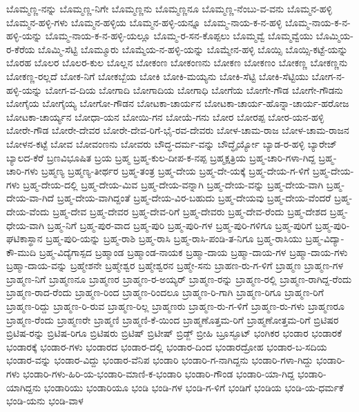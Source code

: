 ಬೊಮ್ಮಣ್ಣ-ನನ್ನು
ಬೊಮ್ಮಣ್ಣ-ನಿಗೇ
ಬೊಮ್ಮಣ್ಣನು
ಬೊಮ್ಮಣ್ಣನೂ
ಬೊಮ್ಮಣ್ಣ-ನೆಂಬು-ವ-ವನು
ಬೊಮ್ಮನ-ಹಳ್ಳಿ
ಬೊಮ್ಮನ-ಹಳ್ಳಿ-ಗಳು
ಬೊಮ್ಮನ-ಹಳ್ಳಿಯ
ಬೊಮ್ಮನ-ಹಳ್ಳಿ-ಯನ್ನೂ
ಬೊಮ್ಮ-ನಾಯ-ಕ-ನ-ಹಳ್ಳಿ
ಬೊಮ್ಮ-ನಾಯ-ಕ-ನ-ಹಳ್ಳಿ-ಯನ್ನು
ಬೊಮ್ಮ-ನಾಯ-ಕ-ನ-ಹಳ್ಳಿ-ಯಲ್ಲೂ
ಬೊಮ್ಮ-ರ-ಸನ-ಕೊಪ್ಪಲು
ಬೊಮ್ಮವ್ವೆ
ಬೊಮ್ಮವ್ವೆಯು
ಬೊಮ್ಮಿಯ-ರ-ಕೆರೆಯ
ಬೊಮ್ಮಿ-ಸೆಟ್ಟಿ
ಬೊಮ್ಮೂರು
ಬೊಮ್ಮೆಯ-ನ-ಹಳ್ಳಿ-ಯನ್ನು
ಬೊಮ್ಮೇನ-ಹಳ್ಳಿ
ಬೊಯ್ಸಿ
ಬೊಯ್ಸಿ-ಕಟ್ಟೆ-ಯನ್ನು
ಬೊರಹ
ಬೊಲರ
ಬೊಲರ-ಕುಲ
ಬೊಲ್ಲನ
ಬೋಕಂಣ
ಬೋಕಂಣನು
ಬೋಕಣ
ಬೋಕಣಂ
ಬೋಕಣ್ಣ
ಬೋಕಣ್ಣನು
ಬೋಕಣ್ಣ-ರಲ್ಲದೆ
ಬೋಕ-ನಿಗೆ
ಬೋಕಬ್ಬೆಯ
ಬೋಕಿ
ಬೋಕಿ-ಮಯ್ಯನು
ಬೋಕಿ-ಸೆಟ್ಟಿ
ಬೋಕಿ-ಸೆಟ್ಟಿಯು
ಬೋಗ-ನ-ಹಳ್ಳಿ-ಯನ್ನು
ಬೋಗ-ವ-ದಿಯ
ಬೋಗಾದಿ
ಬೋಗಾದಿಯ
ಬೋಗಾಧಿ
ಬೋಗೆಯ
ಬೋಗೇ-ಗೌಡ
ಬೋಗೇ-ಗೌಡನು
ಬೋಗೈಯ
ಬೋಗೈಯ್ಯ
ಬೋಗೋ-ಗೌಡನ
ಬೋಟಕಾ-ಚಾರ್ಯನ
ಬೋಟಕಾ-ಚಾರ್ಯ-ಹೊನ್ನಾ-ಚಾರ್ಯ-ಹರೋಜ
ಬೋಟಕಾ-ಚಾರ್ಯ್ಯನ
ಬೋಧಾ-ಯನ
ಬೋಯಿ-ಗನ
ಬೋಯೆ-ಗನು
ಬೋರ
ಬೋರಪ್ಪ
ಬೋರ-ಯನ-ಹಳ್ಳಿ
ಬೋರೇ-ಗೌಡ
ಬೋರೇ-ದೇವರ
ಬೋರೇ-ದೇವ-ರಿಗೆ-ಭೈ-ರವ-ದೇವರು
ಬೋಳ-ಚಾಮ-ರಾಜ
ಬೋಳ-ಚಾಮ-ರಾಜನ
ಬೋಳನ-ಕಟ್ಟೆ
ಬೋವ
ಬೋವಂಣನು
ಬೋವರು
ಬೌದ್ಧ-ದರ್ಮ-ವನ್ನು
ಬೌದ್ಧೈರ್ಯ್ಯೋ
ಬ್ಯಾಡ-ರ-ಹಳ್ಳಿ
ಬ್ಯಾರೇಜ್
ಬ್ಯಾಲದ-ಕೆರೆ
ಬ್ರಣವಿಭೂಷಿತ
ಬ್ರಯ
ಬ್ರಹ್ಮ
ಬ್ರಹ್ಮ-ಕುಲ-ದೀಪ-ಕ-ನಪ್ಪ
ಬ್ರಹ್ಮಕ್ಷತ್ರಿಯ
ಬ್ರಹ್ಮ-ಚಾರಿ-ಗಳಾ-ಗಿದ್ದ
ಬ್ರಹ್ಮ-ಚಾರಿ-ಗಳು
ಬ್ರಹ್ಮಣ್ಯ
ಬ್ರಹ್ಮಣ್ಯ-ತೀರ್ಥರ
ಬ್ರಹ್ಮ-ತಂತ್ರ
ಬ್ರಹ್ಮ-ದೇಯ
ಬ್ರಹ್ಮ-ದೇ-ಯಕ್ಕೆ
ಬ್ರಹ್ಮ-ದೇಯ-ಗ-ಳಿಗೆ
ಬ್ರಹ್ಮ-ದೇಯ-ಗಳು
ಬ್ರಹ್ಮ-ದೇಯ-ದಲ್ಲಿ
ಬ್ರಹ್ಮ-ದೇಯ-ಮಿವ
ಬ್ರಹ್ಮ-ದೇಯ-ವನ್ನಾಗಿ
ಬ್ರಹ್ಮ-ದೇಯ-ವನ್ನು
ಬ್ರಹ್ಮ-ದೇಯ-ವಾಗಿ
ಬ್ರಹ್ಮ-ದೇಯ-ವಾ-ಗಿದೆ
ಬ್ರಹ್ಮ-ದೇಯ-ವಾಗಿದ್ದಂತೆ
ಬ್ರಹ್ಮ-ದೇಯ-ವಿರ-ಬಹುದು
ಬ್ರಹ್ಮ-ದೇಯವು
ಬ್ರಹ್ಮ-ದೇಯ-ವೆಂದರೆ
ಬ್ರಹ್ಮ-ದೇಯ-ವೆಂದು
ಬ್ರಹ್ಮ-ದೇವ
ಬ್ರಹ್ಮ-ದೇವರ
ಬ್ರಹ್ಮ-ದೇವ-ರಿಗೆ
ಬ್ರಹ್ಮ-ದೇವರು
ಬ್ರಹ್ಮ-ದೇವ-ರೆಂದು
ಬ್ರಹ್ಮ-ದೇಶದ
ಬ್ರಹ್ಮ-ಧೇಯ-ವಾಗಿ
ಬ್ರಹ್ಮ-ನಿಗೆ
ಬ್ರಹ್ಮ-ಪುರ-ವಾದ
ಬ್ರಹ್ಮ-ಪುರಿ
ಬ್ರಹ್ಮ-ಪುರಿ-ಗಳ
ಬ್ರಹ್ಮ-ಪುರಿ-ಗಳಿಗೂ
ಬ್ರಹ್ಮ-ಪುರಿಗೆ
ಬ್ರಹ್ಮ-ಪುರಿ-ಘಟಿಕಾಸ್ಥಾನ
ಬ್ರಹ್ಮ-ಪುರಿ-ಯನ್ನು
ಬ್ರಹ್ಮ-ರಾಶಿ
ಬ್ರಹ್ಮ-ರಾಸಿ
ಬ್ರಹ್ಮ-ರಾಸಿ-ಪಂಡಿ-ತ-ನಿಗೂ
ಬ್ರಹ್ಮ-ರಾಸಿಯು
ಬ್ರಹ್ಮ-ವಿದ್ಯಾ-ಕೌ-ಮುದಿ
ಬ್ರಹ್ಮ-ವಿದ್ಯೆಗಾಸ್ಪದ
ಬ್ರಹ್ಮಾಂಡ
ಬ್ರಹ್ಮಾಂಡ-ನಾಯಕ
ಬ್ರಹ್ಮಾ-ದಾಯ
ಬ್ರಹ್ಮಾ-ದಾಯ-ಗಳ
ಬ್ರಹ್ಮಾ-ದಾಯ-ಗಳು
ಬ್ರಹ್ಮಾ-ದಾಯ-ವನ್ನು
ಬ್ರಹ್ಮೇಶನೇ
ಬ್ರಹ್ಮೇಶ್ವರ
ಬ್ರಹ್ಮೇಶ್ವರನ
ಬ್ರಹ್ಮೇ-ಸನು
ಬ್ರಾಹಣ-ರು-ಗ-ಳಿಗೆ
ಬ್ರಾಹ್ಮಣ
ಬ್ರಾಹ್ಮಣ-ಗಳ
ಬ್ರಾಹ್ಮಣ-ನಿಗೆ
ಬ್ರಾಹ್ಮಣನೂ
ಬ್ರಾಹ್ಮಣರ
ಬ್ರಾಹ್ಮಣ-ರ-ಅಯ್ಯರ್
ಬ್ರಾಹ್ಮಣ-ರನ್ನು
ಬ್ರಾಹ್ಮಣ-ರಲ್ಲಿ
ಬ್ರಾಹ್ಮಣ-ರಾಗಿದ್ದ-ರೆಂದು
ಬ್ರಾಹ್ಮಣ-ರಾದ-ರೆಂದು
ಬ್ರಾಹ್ಮಣ-ರಿಂದ
ಬ್ರಾಹ್ಮಣ-ರಿಂದಲೂ
ಬ್ರಾಹ್ಮಣ-ರಿ-ಗಾಗಿ
ಬ್ರಾಹ್ಮಣ-ರಿಗೂ
ಬ್ರಾಹ್ಮಣ-ರಿಗೆ
ಬ್ರಾಹ್ಮಣ-ರಿದ್ದು
ಬ್ರಾಹ್ಮಣ-ರಿ-ರುವ
ಬ್ರಾಹ್ಮಣ-ರಿಲ್ಲ
ಬ್ರಾಹ್ಮಣರು
ಬ್ರಾಹ್ಮಣ-ರು-ಗ-ಳಿಗೆ
ಬ್ರಾಹ್ಮಣ-ರು-ಗಳು
ಬ್ರಾಹ್ಮಣರೂ
ಬ್ರಾಹ್ಮಣ-ರೆಂದು
ಬ್ರಾಹ್ಮಣರೇ
ಬ್ರಾಹ್ಮಣಿ
ಬ್ರಾಹ್ಮಣಿ-ಕೆ-ಯಿಂದ
ಬ್ರಾಹ್ಮಣೊತ್ತಮ-ರಿಗೆ
ಬ್ರಾಹ್ಮಣೋತ್ತಮ-ರಿಗೆ
ಬ್ರಿಟಿಷರ
ಬ್ರಿಟಿಷ-ರನ್ನು
ಬ್ರಿಟಿಷ-ರಿಗೂ
ಬ್ರಿಟಿಷರು
ಬ್ರಿಟಿಷ್
ಬ್ರಿಟೀಷ್
ಬ್ರಿಡ್ಜ್
ಬ್ರೀಹಿ
ಬ್ರೂಸ್ಫೂಟ್
ಭಂಗಿಕರ
ಭಂಡಾರ
ಭಂಡಾರಕೆ
ಭಂಡಾರಕ್ಕೆ
ಭಂಡಾರ-ಗಳು
ಭಂಡಾರದ
ಭಂಡಾರ-ದಲ್ಲಿ
ಭಂಡಾರ-ದಿಂದ
ಭಂಡಾರದ್ರೋಹ
ಭಂಡಾರ-ಬ-ಸದಿಯ
ಭಂಡಾರ-ವನ್ನು
ಭಂಡಾರ-ವಿದ್ದು
ಭಂಡಾರ-ವೆನಿಪ
ಭಂಡಾರಿ
ಭಂಡಾರಿ-ಗ-ನಾಗಿದ್ದನು
ಭಂಡಾರಿ-ಗಳಾ-ಗಿದ್ದು
ಭಂಡಾರಿ-ಗಳು
ಭಂಡಾರಿ-ಗಳು-ಹಿರಿ-ಯ-ಭಂಡಾರಿ-ಮಾಣಿ-ಕ-ಭಂಡಾರಿ
ಭಂಡಾರಿ-ಗೌಂಡ
ಭಂಡಾರಿ-ಯಾ-ಗಿದ್ದ
ಭಂಡಾರಿ-ಯಾಗಿದ್ದನು
ಭಂಡಾರಿಯು
ಭಂಡಾರಿಯೂ
ಭಂಡಿ
ಭಂಡಿ-ಗಳ
ಭಂಡಿ-ಗ-ಳಿಗೆ
ಭಂಡಿಗೆ
ಭಂಡಿಯ
ಭಂಡಿ-ಯ-ಧರ್ಮಕೆ
ಭಂಡಿ-ಯನು
ಭಂಡಿ-ವಾಳ
